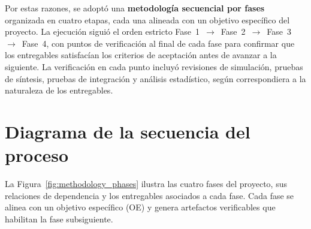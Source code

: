 Por estas razones, se adoptó una \textbf{metodología secuencial por
fases} organizada en cuatro etapas, cada una alineada con un objetivo
específico del proyecto. La ejecución siguió el orden estricto
Fase~1~$\rightarrow$~Fase~2~$\rightarrow$~Fase~3~$\rightarrow$~Fase~4,
con puntos de verificación al final de cada fase para confirmar que los
entregables satisfacían los criterios de aceptación antes de avanzar a
la siguiente. La verificación en cada punto incluyó revisiones de
simulación, pruebas de síntesis, pruebas de integración y análisis
estadístico, según correspondiera a la naturaleza de los entregables.

\section{Diagrama de la secuencia del proceso}
\label{sec:secuencia}

La Figura~\ref{fig:methodology_phases} ilustra las cuatro fases del
proyecto, sus relaciones de dependencia y los entregables asociados a
cada fase. Cada fase se alinea con un objetivo específico (OE) y genera
artefactos verificables que habilitan la fase subsiguiente.

